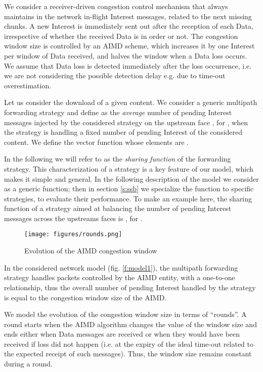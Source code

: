 \documentclass{sig-alternate-10pt}
\begin{document}
We consider a receiver-driven congestion control mechanism that always maintains in the network  in-flight Interest messages, related to the next  missing chunks. A new Interest is immediately sent out after the reception of each Data, irrespective of whether the received Data is in order or not. The congestion window size  is controlled by an AIMD scheme, which increases it by one Interest per window  of Data received, and halves the window when a Data loss occurs. We assume that Data loss is detected immediately after the loss occurrence, i.e. we are not considering the possible detection delay e.g. due to time-out overestimation.    

Let us consider the download of a given content. We consider a generic multipath forwarding strategy and define  as the \emph{average} number of pending Interest messages injected by the considered strategy on the upstream face , for , when the strategy is handling a fixed number of  pending Interest of the considered content. We define the vector function  whose elements are .



In the following we will refer to   as the \emph{sharing function} of the forwarding strategy. This characterization of a strategy is a key feature of our model, which makes it simple and general. In the following description of the model we consider  as a generic function; then in section \ref{s:ssb} we specialize the function  to specific strategies, to evaluate their performance.
To make an example here, the sharing function of a strategy aimed at balancing the number of pending Interest messages across the upstreams faces is , for .




\begin{figure}[t]
\centering
\texttt{[image: figures/rounds.png]}
\caption{Evolution of the AIMD congestion window}
\label{f:model2}
\vspace{-10pt}
\end{figure}

In the considered network model (fig. \ref{f:model1}), the multipath forwarding strategy handles packets controlled by the AIMD entity, with a one-to-one relationship, thus the overall number of pending Interest  handled by the strategy is equal to the congestion window size  of the AIMD.

We model the evolution of the congestion window size in terms of ``rounds''. A round starts when the AIMD algorithm changes the value of the window size  and ends either when  Data messages are received or when they would have been received if loss did not happen (i.e. at the expiry of the ideal time-out related to the expected receipt of such messages). Thus, the window size remains constant during a round.
\end{document}
